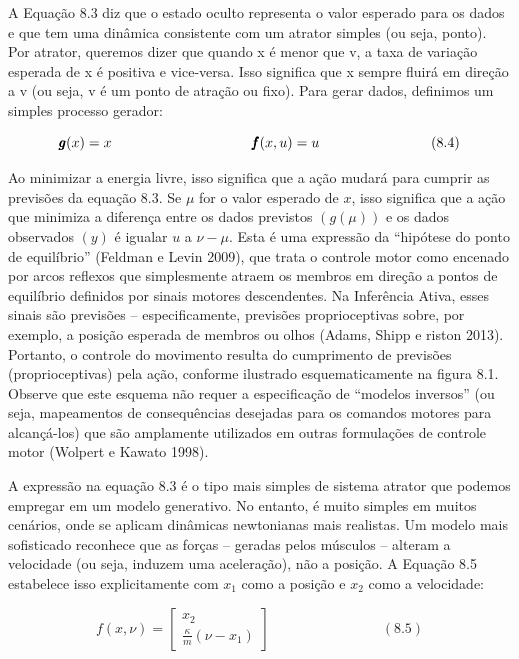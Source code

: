 \documentclass[
  12pt,
]{book}
\begin{document}
A Equação 8.3 diz que o estado oculto representa o valor esperado para os dados e que tem uma dinâmica consistente com um atrator simples (ou seja, ponto). Por atrator, queremos dizer que quando x é menor que v, a taxa de variação esperada de x é positiva e vice-versa. Isso significa que x sempre fluirá em direção a v (ou seja, v é um ponto de atração ou fixo). Para gerar dados, definimos um simples processo gerador:

\[\begin{equation} 
\pmb g(x) = x \qquad\qquad\qquad\qquad\quad\quad\quad  \\ 
\pmb f(x,u) = u \qquad\qquad\qquad\qquad (8.4)
\end{equation}\]

Ao minimizar a energia livre, isso significa que a ação mudará para cumprir as previsões da equação 8.3. Se \(\mu\) for o valor esperado de \(x\), isso significa que a ação que minimiza a diferença entre os dados previstos \((g(\mu))\) e os dados observados \((y)\) é igualar \(u\) a \(\nu − \mu\). Esta é uma expressão da ``hipótese do ponto de equilíbrio'' (Feldman e Levin 2009), que trata o controle motor como encenado por arcos reflexos que simplesmente atraem os membros em direção a pontos de equilíbrio definidos por sinais motores descendentes. Na Inferência Ativa, esses sinais são previsões -- especificamente, previsões proprioceptivas sobre, por exemplo, a posição esperada de membros ou olhos (Adams, Shipp e riston 2013). Portanto, o controle do movimento resulta do cumprimento de previsões (proprioceptivas) pela ação, conforme ilustrado esquematicamente na figura 8.1. Observe que este esquema não requer a especificação de ``modelos inversos'' (ou seja, mapeamentos de consequências desejadas para os comandos motores para alcançá-los) que são amplamente utilizados em outras formulações de controle motor (Wolpert e Kawato 1998).

A expressão na equação 8.3 é o tipo mais simples de sistema atrator que podemos empregar em um modelo generativo. No entanto, é muito simples em muitos cenários, onde se aplicam dinâmicas newtonianas mais realistas. Um modelo mais sofisticado reconhece que as forças -- geradas pelos músculos -- alteram a velocidade (ou seja, induzem uma aceleração), não a posição. A Equação 8.5 estabelece isso explicitamente com \(x_1\) como a posição e \(x_2\) como a velocidade:

\[\begin{equation} 
f(x, \nu) = \begin{bmatrix}  x_2\\ \frac{\kappa}{m}(\nu-x_1) \end{bmatrix} \qquad\qquad\qquad\qquad (8.5)
\end{equation}\]
\end{document}
